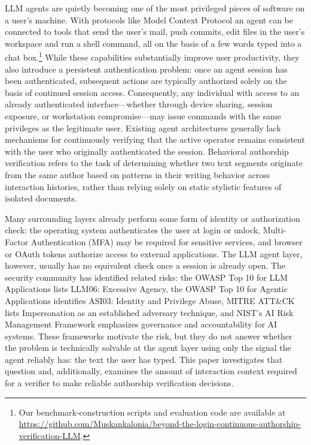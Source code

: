 \documentclass[11pt]{article}
\begin{document}
LLM agents are quietly becoming one of the most privileged pieces of software on a user's machine. With protocols like Model Context Protocol \citep{anthropic2024mcp} an agent can be connected to tools that send the user's mail, push commits, edit files in the user's workspace and run a shell command, all on the basis of a few words typed into a chat box.\footnote{Our benchmark-construction scripts and evaluation code are available at \url{https://github.com/Muskankalonia/beyond-the-login-continuous-authorship-verification-LLM}.} While these capabilities substantially improve user productivity, they also introduce a persistent authentication problem: once an agent session has been authenticated, subsequent actions are typically authorized solely on the basis of continued session access. Consequently, any individual with access to an already authenticated interface—whether through device sharing, session exposure, or workstation compromise—may issue commands with the same privileges as the legitimate user. Existing agent architectures generally lack mechanisms for continuously verifying that the active operator remains consistent with the user who originally authenticated the session. Behavioral authorship verification refers to the task of determining whether two text segments originate from the same author based on patterns in their writing behavior across interaction histories, rather than relying solely on static stylistic features of isolated documents.

Many surrounding layers already perform some form of identity or authorization check: the operating system authenticates the user at login or unlock, Multi-Factor Authentication (MFA) may be required for sensitive services, and browser or OAuth tokens authorize access to external applications. The LLM agent layer, however, usually has no equivalent check once a session is already open. The security community has identified related risks: the OWASP Top 10 for LLM Applications \citep{owasp2025llm} lists LLM06: Excessive Agency, the OWASP Top 10 for Agentic Applications \citep{owasp2026agentic} identifies ASI03: Identity and Privilege Abuse, MITRE ATT\&CK lists Impersonation \citep{mitre_t1656} as an established adversary technique, and NIST's AI Risk Management Framework \citep{nist2023airmf} emphasizes governance and accountability for AI systems. These frameworks motivate the risk, but they do not answer whether the problem is technically solvable at the agent layer using only the signal the agent reliably has: the text the user has typed. This paper investigates that question and, additionally, examines the amount of interaction context required for a verifier to make reliable authorship verification decisions.
\end{document}
